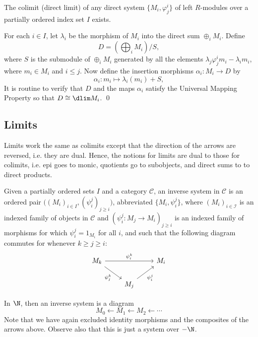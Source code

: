 \begin{prop}
The colimit (direct limit) of any direct system $\{M_i,\varphi_j^i\}$ of left $R$-modules over a partially ordered index set $I$ exists. 
\end{prop}

\pf For each $i \in I$, let $\lambda_i$ be the morphism of $M_i$ into the direct sum $\oplus_i M_i$. Define
	\[
	D = \left( \bigoplus_i M_i \right)/ S,
	\]
where $S$ is the submodule of $\oplus_i M_i$ generated by all the elements $\lambda_j \varphi^i_j m_i -\lambda_i m_i$, where $m_i \in M_i$ and $i \leq j$. Now define the insertion morphisms $\alpha_i: M_i \rightarrow D$ by 
	\[
	\alpha_i: m_i \mapsto \lambda_i(m_i)+S,
	\]
It is routine to verify that $D$ and the maps $\alpha_i$ satisfy the Universal Mapping Property so that $D \cong \dlim M_i$. \qed \\



\subsection{Limits}



Limits work the same as colimits except that the direction of the arrows are reversed, i.e. they are dual. Hence, the notions for limits are dual to those for colimits, i.e. epi goes to monic, quotients go to subobjects, and direct sums to to direct products. 


\begin{dfn}
Given a partially ordered sets $I$ and a category $\mathcal{C}$, an inverse system in $\mathcal{C}$ is an ordered pair $\big((M_i)_{i \in I}, (\psi_i^j)_{j \geq i} \big)$, abbreviated $\{M_i,\psi_i^j\}$, where $(M_i)_{i \in \mathcal{I}}$ is an indexed family of objects in $\mathcal{C}$ and $(\psi_i^j: M_j \to M_i)_{j \geq i}$ is an indexed family of morphisms for which $\psi_i^j=1_{M_i}$ for all $i$, and such that the following diagram commutes for whenever $k \geq j \geq i$:
	\[
	\begin{tikzcd}
	M_k \arrow{rr}{\psi_i^k} \arrow[swap]{dr}{\psi_j^k} & & M_i \\
	& M_j \arrow[swap]{ru}{\psi_i^j} & 
	\end{tikzcd}
	\]
\end{dfn}


\begin{ex}
In $\N$, then an inverse system is a diagram 
	\[
	M_0 \leftarrow M_1 \leftarrow M_2 \leftarrow \cdots
	\]
Note that we have again excluded identity morphisms and the composites of the arrows above. Observe also that this is just a system over $-\N$. \xqed
\end{ex}


